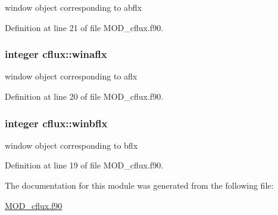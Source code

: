 window object corresponding to abflx 



Definition at line 21 of file M\-O\-D\-\_\-cflux.\-f90.

\hypertarget{classcflux_a004ab716c2eccb822cb513fc593a9d37}{
\subsubsection[{winaflx}]{\setlength{\rightskip}{0pt plus 5cm}integer cflux\-::winaflx}}\label{classcflux_a004ab716c2eccb822cb513fc593a9d37}


window object corresponding to aflx 



Definition at line 20 of file M\-O\-D\-\_\-cflux.\-f90.

\hypertarget{classcflux_a1a02e1cdf1c9a0d2dc4956b2f726c5ac}{
\subsubsection[{winbflx}]{\setlength{\rightskip}{0pt plus 5cm}integer cflux\-::winbflx}}\label{classcflux_a1a02e1cdf1c9a0d2dc4956b2f726c5ac}


window object corresponding to bflx 



Definition at line 19 of file M\-O\-D\-\_\-cflux.\-f90.



The documentation for this module was generated from the following file\-:\begin{DoxyCompactItemize}
\item 
\hyperlink{MOD__cflux_8f90}{M\-O\-D\-\_\-cflux.\-f90}\end{DoxyCompactItemize}

